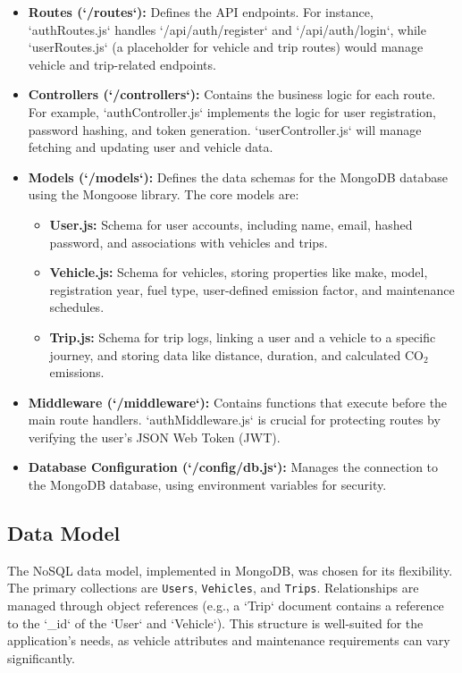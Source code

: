 \begin{itemize}
    \item \textbf{Routes (`/routes`):} Defines the API endpoints. For instance, `authRoutes.js` handles `/api/auth/register` and `/api/auth/login`, while `userRoutes.js` (a placeholder for vehicle and trip routes) would manage vehicle and trip-related endpoints.
    \item \textbf{Controllers (`/controllers`):} Contains the business logic for each route. For example, `authController.js` implements the logic for user registration, password hashing, and token generation. `userController.js` will manage fetching and updating user and vehicle data.
    \item \textbf{Models (`/models`):} Defines the data schemas for the MongoDB database using the Mongoose library. The core models are:
    \begin{itemize}
        \item \textbf{User.js:} Schema for user accounts, including name, email, hashed password, and associations with vehicles and trips.
        \item \textbf{Vehicle.js:} Schema for vehicles, storing properties like make, model, registration year, fuel type, user-defined emission factor, and maintenance schedules.
        \item \textbf{Trip.js:} Schema for trip logs, linking a user and a vehicle to a specific journey, and storing data like distance, duration, and calculated CO$_2$ emissions.
    \end{itemize}
    \item \textbf{Middleware (`/middleware`):} Contains functions that execute before the main route handlers. `authMiddleware.js` is crucial for protecting routes by verifying the user's JSON Web Token (JWT).
    \item \textbf{Database Configuration (`/config/db.js`):} Manages the connection to the MongoDB database, using environment variables for security.
\end{itemize}

\subsection{Data Model}
The NoSQL data model, implemented in MongoDB, was chosen for its flexibility. The primary collections are \texttt{Users}, \texttt{Vehicles}, and \texttt{Trips}. Relationships are managed through object references (e.g., a `Trip` document contains a reference to the `\_id` of the `User` and `Vehicle`). This structure is well-suited for the application's needs, as vehicle attributes and maintenance requirements can vary significantly.

